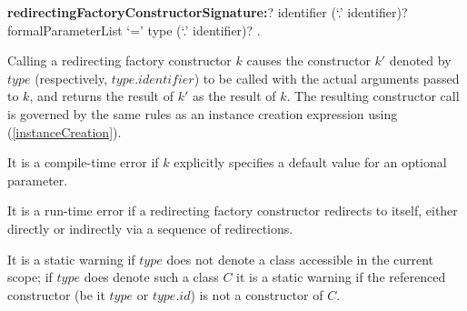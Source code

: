 \documentclass{article}
\begin{document}
\begin{grammar}
{\bf redirectingFactoryConstructorSignature:}\CONST{}? \FACTORY{} identifier (`{\escapegrammar .}' identifier)? formalParameterList
  \gnewline{} `=' type (`{\escapegrammar .}' identifier)?
  .
\end{grammar}

\LMHash{}
Calling a redirecting factory constructor $k$ causes the constructor $k'$ denoted by $type$ (respectively, $type.identifier$) to be called with the actual arguments passed to $k$, and returns the result of $k'$ as the result of $k$.
The resulting constructor call is governed by the same rules as an instance creation expression using \NEW{} (\ref{instanceCreation}).


\LMHash{}
It is a compile-time error if $k$ explicitly specifies a default value for an optional parameter.

\LMHash{}
It is a run-time error if a redirecting factory constructor redirects to itself, either directly or indirectly via a sequence of redirections. %



\LMHash{}
It is a static warning if $type$ does not denote a class accessible in the current scope; if $type$ does denote such a class $C$ it is a static warning if the referenced constructor (be it $type$ or $type.id$) is not a constructor of $C$.
\end{document}
